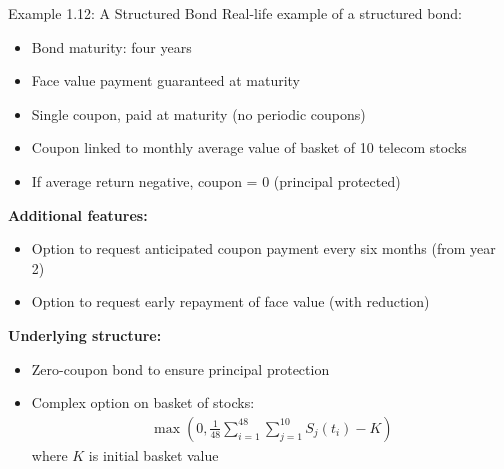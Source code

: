 \documentclass[10pt]{beamer}
\begin{document}
\begin{frame}{Example 1.12: A Structured Bond}
  Real-life example of a structured bond:
  \begin{itemize}
    \item Bond maturity: four years
    \item Face value payment guaranteed at maturity
    \item Single coupon, paid at maturity (no periodic coupons)
    \item Coupon linked to monthly average value of basket of 10 telecom stocks
    \item If average return negative, coupon = 0 (principal protected)
  \end{itemize}
  
  \pause
  \textbf{Additional features:}
  \begin{itemize}
    \item Option to request anticipated coupon payment every six months (from year 2)
    \item Option to request early repayment of face value (with reduction)
  \end{itemize}
  
  \pause
  \textbf{Underlying structure:}
  \begin{itemize}
    \item Zero-coupon bond to ensure principal protection
    \item Complex option on basket of stocks:
    \begin{align*}
      \max\left(0, \tfrac{1}{48}\sum_{i=1}^{48}\sum_{j=1}^{10}S_j(t_i) - K\right)
    \end{align*}
    where $K$ is initial basket value
  \end{itemize}
\end{frame}
\end{document}
